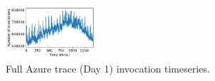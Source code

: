 \begin{figure}
 \centering \includegraphics[width=0.3\textwidth]{../graphs/azure_analysis/whole_trace.pdf}
  \caption{Full Azure trace (Day 1) invocation timeseries.}
  \label{fig:whole-trace}
\end{figure}


